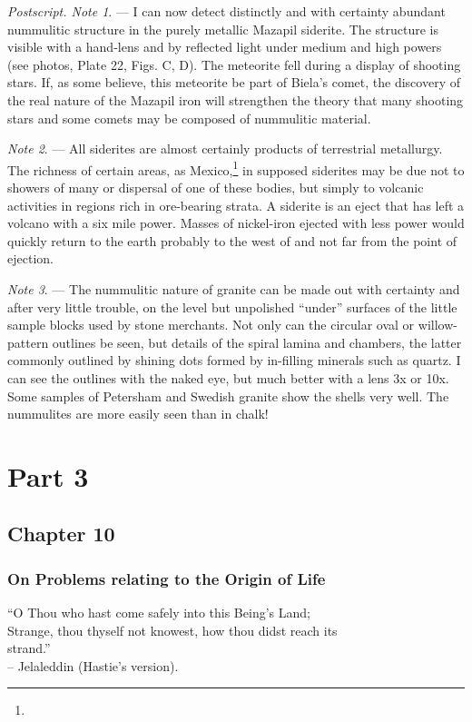 \documentclass[a4paper, 12pt, oneside]{article}
\begin{document}
\emph{Postscript. Note 1}. --- I can now detect distinctly and with certainty abundant nummulitic structure in the purely metallic Mazapil siderite. The structure is visible with a hand-lens and by reflected light under medium and high powers (see photos, Plate 22, Figs. C, D). The meteorite fell during a display of shooting stars. If, as some believe, this meteorite be part of Biela's comet, the discovery of the real nature of the Mazapil iron will strengthen the theory that many shooting stars and some comets may be composed of nummulitic material.

\emph{Note 2}. --- All siderites are almost certainly products of terrestrial metallurgy. The richness of certain areas, as Mexico,\footnote{} in supposed siderites may be due not to showers of many or dispersal of one of these bodies, but simply to volcanic activities in regions rich in ore-bearing strata. A siderite is an eject that has left a volcano with a six mile power. Masses of nickel-iron ejected with less power would quickly return to the earth probably to the west of and not far from the point of ejection.

\emph{Note 3}. --- The nummulitic nature of granite can be made out with certainty and after very little trouble, on the level but unpolished ``under'' surfaces of the little sample blocks used by stone merchants. Not only can the circular oval or willow-pattern outlines be seen, but details of the spiral lamina and chambers, the latter commonly outlined by shining dots formed by in-filling minerals such as quartz. I can see the outlines with the naked eye, but much better with a lens 3x or 10x. Some samples of Petersham and Swedish granite show the shells very well. The nummulites are more easily seen than in chalk!
\clearpage
\section{Part 3}
\subsection{Chapter 10}
\subsubsection{On Problems relating to the Origin of Life}
\begin{displayquote}
``O Thou who hast come safely into this Being's Land;\\Strange, thou thyself not knowest, how thou didst reach its\\strand.''\\-- Jelaleddin (Hastie's version).
\end{displayquote}
\end{document}
